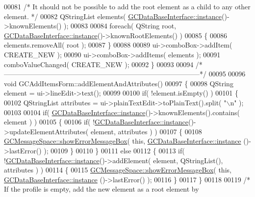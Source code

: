 \begin{DoxyCode}
00081   \textcolor{comment}{/* It should not be possible to add the root element as a child to any other
       element. */}
00082   QStringList elements( \hyperlink{class_g_c_data_base_interface_a1baea9c0667aa8b610ec30076fcab84c}{GCDataBaseInterface::instance}()->knownElements() );
00083 
00084   \textcolor{keywordflow}{foreach}( QString root, \hyperlink{class_g_c_data_base_interface_a1baea9c0667aa8b610ec30076fcab84c}{GCDataBaseInterface::instance}()->knownRootElements() )
00085   \{
00086     elements.removeAll( root );
00087   \}
00088 
00089   ui->comboBox->addItem( CREATE\_NEW );
00090   ui->comboBox->addItems( elements );
00091   comboValueChanged( CREATE\_NEW );
00092 \}
00093 
00094 \textcolor{comment}{/*
      --------------------------------------------------------------------------------------*/}
00095 
00096 \textcolor{keywordtype}{void} GCAddItemsForm::addElementAndAttributes()
00097 \{
00098   QString element = ui->lineEdit->text();
00099 
00100   \textcolor{keywordflow}{if}( !element.isEmpty() )
00101   \{
00102     QStringList attributes = ui->plainTextEdit->toPlainText().split( \textcolor{stringliteral}{"\(\backslash\)n"} );
00103 
00104     \textcolor{keywordflow}{if}( \hyperlink{class_g_c_data_base_interface_a1baea9c0667aa8b610ec30076fcab84c}{GCDataBaseInterface::instance}()->knownElements().contains( element ) )
00105     \{
00106       \textcolor{keywordflow}{if}( !\hyperlink{class_g_c_data_base_interface_a1baea9c0667aa8b610ec30076fcab84c}{GCDataBaseInterface::instance}()->updateElementAttributes( element, 
      attributes ) )
00107       \{
00108         \hyperlink{namespace_g_c_message_space_ab118b3a133686167617eb955029fd44e}{GCMessageSpace::showErrorMessageBox}( \textcolor{keyword}{this}, \hyperlink{class_g_c_data_base_interface_a1baea9c0667aa8b610ec30076fcab84c}{GCDataBaseInterface::instance}
      ()->lastError() );
00109       \}
00110     \}
00111     \textcolor{keywordflow}{else}
00112     \{
00113       \textcolor{keywordflow}{if}( !\hyperlink{class_g_c_data_base_interface_a1baea9c0667aa8b610ec30076fcab84c}{GCDataBaseInterface::instance}()->addElement( element, QStringList(),
       attributes ) )
00114       \{
00115         \hyperlink{namespace_g_c_message_space_ab118b3a133686167617eb955029fd44e}{GCMessageSpace::showErrorMessageBox}( \textcolor{keyword}{this}, \hyperlink{class_g_c_data_base_interface_a1baea9c0667aa8b610ec30076fcab84c}{GCDataBaseInterface::instance}
      ()->lastError() );
00116       \}
00117     \}
00118 
00119     \textcolor{comment}{/* If the profile is empty, add the new element as a root element by
}
\end{DoxyCode}

